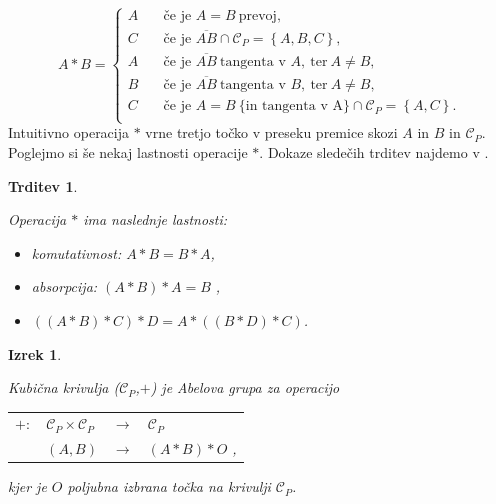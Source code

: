 \documentclass[12pt,a4paper,twoside]{article}
\theoremstyle{definition} %
\theoremstyle{plain} %
\newtheorem{izrek}[definicija]{Izrek}
\newtheorem{trditev}[definicija]{Trditev}
\numberwithin{equation}{section}  %
\begin{document}
\[ A \ast B =
\begin{cases}
A & \quad \text{če je } A=B \ \text{prevoj},\\
C & \quad \text{če je } \overline{AB} \cap \mathcal{C}_P = \left\{ A,B,C \right\},\\
A & \quad \text{če je } \overline{AB} \ \text{tangenta v } A,\ \text{ter} \ A \neq B,\\
B & \quad \text{če je } \overline{AB} \ \text{tangenta v } B,\ \text{ter} \ A \neq B,\\
C &\quad \text{če je } A=B \ \{\text{in tangenta v A}\} \cap \mathcal{C}_P = \left\{ A,C \right\}.\\
\end{cases}
\]
Intuitivno operacija $\ast$ vrne tretjo točko v preseku premice skozi $A$ in $B$ in $\mathcal{C}_P$. Poglejmo si še nekaj lastnosti operacije $\ast$. Dokaze sledečih trditev najdemo v \cite[Poglavje 17.3]{gibson}.

\begin{trditev}~

\label{last zvezda}
Operacija $\ast$ ima naslednje lastnosti:

\begin{itemize}
\item komutativnost: $ A \ast B = B \ast A$,
\item absorpcija: $(A \ast B ) \ast A = B$ ,
\item $((A \ast B) \ast C ) \ast D = A \ast ((B \ast D)\ast C)$.
\end{itemize}
\end{trditev}

\begin{izrek}~

Kubična krivulja ($\mathcal{C}_P$,$+$) je Abelova grupa za operacijo

\begin{table}[ht]
\centering
\begin{tabular}{llll}
$+:$ & $\mathcal{C}_P \times \mathcal{C}_P$ & $\rightarrow$ & $\mathcal{C}_P$ \\
& $(A,B)$ & $\rightarrow$ & $(A\ast B)\ast O$ ,
\end{tabular}
\end{table}
kjer je $O$ poljubna izbrana točka na krivulji $ \mathcal{C}_P$.
\end{izrek}
\end{document}

